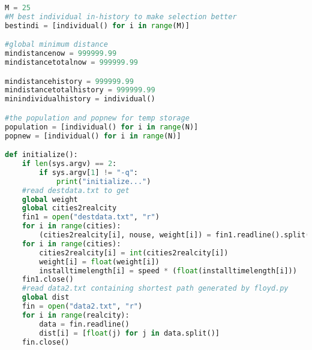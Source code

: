 \documentclass[UTF8,cs4size]{ctexart}
\begin{document}
\begin{lstlisting}[language=Python]
M = 25
#M best individual in-history to make selection better
bestindi = [individual() for i in range(M)]

#global minimum distance
mindistancenow = 999999.99
mindistancetotalnow = 999999.99

mindistancehistory = 999999.99
mindistancetotalhistory = 999999.99
minindividualhistory = individual()

#the population and popnew for temp storage
population = [individual() for i in range(N)]
popnew = [individual() for i in range(N)]

def initialize():
    if len(sys.argv) == 2:
        if sys.argv[1] != "-q":
            print("initialize...")
    #read destdata.txt to get 
    global weight
    global cities2realcity
    fin1 = open("destdata.txt", "r")
    for i in range(cities):
        (cities2realcity[i], nouse, weight[i]) = fin1.readline().split()
    for i in range(cities):
        cities2realcity[i] = int(cities2realcity[i])
        weight[i] = float(weight[i])
        installtimelength[i] = speed * (float(installtimelength[i]))
    fin1.close()
    #read data2.txt containing shortest path generated by floyd.py
    global dist
    fin = open("data2.txt", "r")
    for i in range(realcity):
        data = fin.readline()
        dist[i] = [float(j) for j in data.split()]
    fin.close()


\end{lstlisting}
\end{document}
